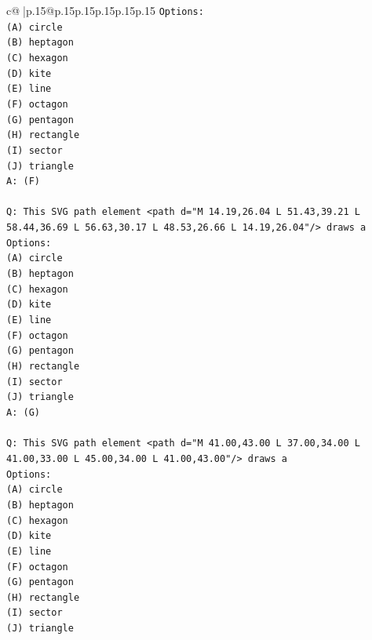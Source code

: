 \documentclass{article}
\begin{document}
{\begin{supertabular}{c@{$\;$}|p{.15\linewidth}@{}p{.15\linewidth}p{.15\linewidth}p{.15\linewidth}p{.15\linewidth}p{.15\linewidth}}
{{{\texttt{Options:} \\
\texttt{(A) circle} \\
\texttt{(B) heptagon} \\
\texttt{(C) hexagon} \\
\texttt{(D) kite} \\
\texttt{(E) line} \\
\texttt{(F) octagon} \\
\texttt{(G) pentagon} \\
\texttt{(H) rectangle} \\
\texttt{(I) sector} \\
\texttt{(J) triangle} \\
\texttt{A: (F)} \\
\\ 
\texttt{Q: This SVG path element <path d="M 14.19,26.04 L 51.43,39.21 L 58.44,36.69 L 56.63,30.17 L 48.53,26.66 L 14.19,26.04"/> draws a} \\
\texttt{Options:} \\
\texttt{(A) circle} \\
\texttt{(B) heptagon} \\
\texttt{(C) hexagon} \\
\texttt{(D) kite} \\
\texttt{(E) line} \\
\texttt{(F) octagon} \\
\texttt{(G) pentagon} \\
\texttt{(H) rectangle} \\
\texttt{(I) sector} \\
\texttt{(J) triangle} \\
\texttt{A: (G)} \\
\\ 
\texttt{Q: This SVG path element <path d="M 41.00,43.00 L 37.00,34.00 L 41.00,33.00 L 45.00,34.00 L 41.00,43.00"/> draws a} \\
\texttt{Options:} \\
\texttt{(A) circle} \\
\texttt{(B) heptagon} \\
\texttt{(C) hexagon} \\
\texttt{(D) kite} \\
\texttt{(E) line} \\
\texttt{(F) octagon} \\
\texttt{(G) pentagon} \\
\texttt{(H) rectangle} \\
\texttt{(I) sector} \\
\texttt{(J) triangle} \\
}}}
\end{supertabular}}
\end{document}

